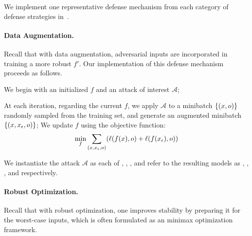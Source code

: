We implement one representative defense mechanism from each category of defense strategies in~.

\paragraph*{Data Augmentation.\;} Recall that with data augmentation, adversarial inputs are incorporated in training a more robust \dnn $f'$. Our implementation of this defense mechanism proceeds as follows.
\begin{myitemize}
\item We begin with an initialized \dnn $f$ and an attack of interest ${\mathcal A}$;
\item At each iteration, regarding the current $f$, we apply ${\mathcal A}$ to a minibatch $\{(x, o)\}$ randomly sampled from the training set, and generate an augmented minibatch $\{(x, x_{\epsilon}, o)\}$;
%
We update $f$ using the objective function:
\begin{equation*}
\min_{f} \sum_{(x, x_{\epsilon}, o)}  (\ell(f(x), o) +  \ell(f(x_{\epsilon}), o))
\end{equation*}
\end{myitemize}
We instantiate the attack ${\mathcal A}$ as each of \ttg, \tth, \ttp, \ttca and refer to the resulting models as \ttg, \tth, \ttp, and {\ttct} \dnn respectively.

\paragraph*{Robust Optimization.\;} Recall that with robust optimization, one improves \dnn stability by preparing it for the worst-case inputs, which is often formulated as an minimax optimization framework.

